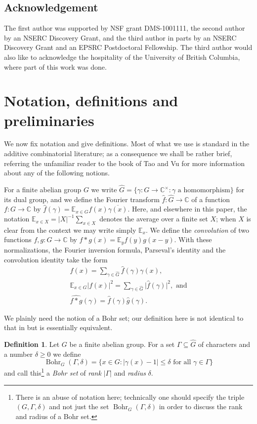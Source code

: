 \documentclass[12pt,a4paper,reqno]{amsart}
\numberwithin{equation}{section}
\theoremstyle{plain}
\theoremstyle{definition}
\newtheorem{defn}[subsection]{Definition}
\renewcommand{\leq}{\leqslant}
\renewcommand{\geq}{\geqslant}
\renewcommand{\subset}{\subseteq}
\def\E{\mathbb{E}}
\def\C{\mathbb{C}}
\def\Ghat{\widehat{G}}
\def\fhat{\widehat{f}}
\DeclareMathOperator{\Bohr}{Bohr}
\providecommand{\abs}[1]{\lvert#1\rvert}
\theoremstyle{plain}
\begin{document}
\subsection*{Acknowledgement}
The first author was supported by NSF grant DMS-1001111, the second author by an NSERC Discovery Grant, and the third author in parts by an NSERC Discovery Grant and an EPSRC Postdoctoral Fellowship. The third author would also like to acknowledge the hospitality of the University of British Columbia, where part of this work was done.

\section{Notation, definitions and preliminaries}
We now fix notation and give definitions. Most of what we use is standard in the additive combinatorial literature; as a consequence we shall be rather brief, referring the unfamiliar reader to the book \cite{tao-vu} of Tao and Vu for more information about any of the following notions.

For a finite abelian group $G$ we write $\Ghat = \{ \gamma : G \to \C^\times : \text{$\gamma$ a homomorphism} \}$ for its dual group, and we define the Fourier transform $\fhat : \Ghat \to \C$ of a function $f : G \to \C$ by $\fhat(\gamma) = \E_{x \in G} f(x) \overline{\gamma(x)}$. Here, and elsewhere in this paper, the notation $\E_{x \in X} = \abs{X}^{-1}\sum_{x \in X}$ denotes the average over a finite set $X$; when $X$ is clear from the context we may write simply $\E_x$. We define the \emph{convolution} of two functions $f, g : G \to \C$ by $f*g(x) = \E_y f(y) g(x-y)$. With these normalizations, the Fourier inversion formula, Parseval's identity and the convolution identity take the form
\begin{gather*}
f(x) = \sum_{\gamma \in \Ghat} \fhat(\gamma) \gamma(x), \\
\E_{x \in G} \abs{f(x)}^2 = \sum_{\gamma \in \Ghat} \abs{\fhat(\gamma)}^2, \text{ and}\\
\widehat{f*g}(\gamma) = \fhat(\gamma) \widehat{g}(\gamma).
\end{gather*}

We plainly need the notion of a Bohr set; our definition here is not identical to that in \cite{tao-vu} but is essentially equivalent.

\begin{defn}
Let $G$ be a finite abelian group. For a set $\Gamma \subset \Ghat$ of characters and a number $\delta \geq 0$ we define
\[ \Bohr_G(\Gamma, \delta) = \{ x \in G : \abs{\gamma(x) - 1} \leq \delta \text{ for all $\gamma \in \Gamma$} \} \]
and call this\footnote{There is an abuse of notation here; technically one should specify the triple $(G,\Gamma,\delta)$ and not just the set $\Bohr_G(\Gamma, \delta)$ in order to discuss the rank and radius of a Bohr set.} a \emph{Bohr set} of \emph{rank} $\abs{\Gamma}$ and \emph{radius} $\delta$.
\end{defn}
\end{document}
